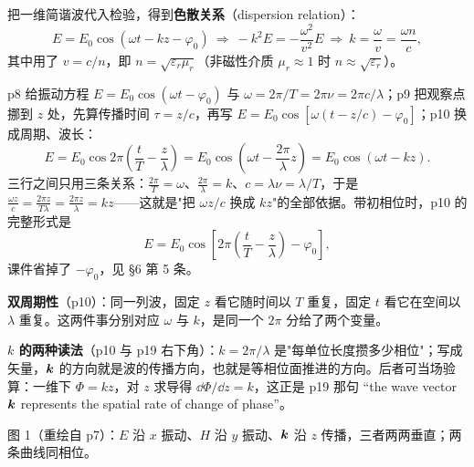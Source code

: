 \documentclass[10pt]{ctexart}
\begin{document}

把一维简谐波代入检验，得到\textbf{色散关系}（dispersion relation）：
\[
E=E_0\cos(\omega t-kz-\varphi_0)
\ \Longrightarrow\
-k^2E=-\frac{\omega^2}{v^2}E
\ \Longrightarrow\
k=\frac{\omega}{v}=\frac{\omega n}{c},
\]
其中用了 $v=c/n$，即 $n=\sqrt{\varepsilon_r\mu_r}$（非磁性介质 $\mu_r\approx1$ 时 $n\approx\sqrt{\varepsilon_r}$）。

\subhdr{1.3 简谐波：四种写法其实是一个}

p8 给振动方程 $E=E_0\cos(\omega t-\varphi_0)$ 与 $\omega=2\pi/T=2\pi\nu=2\pi c/\lambda$；p9 把观察点挪到 $z$ 处，先算传播时间 $\tau=z/c$，再写 $E=E_0\cos[\omega(t-z/c)-\varphi_0]$；p10 换成周期、波长：
\[
E=E_0\cos 2\pi\!\left(\frac{t}{T}-\frac{z}{\lambda}\right)
=E_0\cos\!\left(\omega t-\frac{2\pi}{\lambda}z\right)
=E_0\cos(\omega t-kz).
\]
三行之间只用三条关系：$\frac{2\pi}{T}=\omega$、$\frac{2\pi}{\lambda}=k$、$c=\lambda\nu=\lambda/T$，于是 $\frac{\omega z}{c}=\frac{2\pi z}{T\lambda}=\frac{2\pi z}{\lambda}=kz$——这就是"把 $\omega z/c$ 换成 $kz$"的全部依据。带初相位时，p10 的完整形式是
\[
E=E_0\cos\!\left[2\pi\!\left(\frac{t}{T}-\frac{z}{\lambda}\right)-\varphi_0\right],
\]
课件省掉了 $-\varphi_0$，见 §6 第 5 条。


\textbf{双周期性}（p10）：同一列波，固定 $z$ 看它随时间以 $T$ 重复，固定 $t$ 看它在空间以 $\lambda$ 重复。这两件事分别对应 $\omega$ 与 $k$，是同一个 $2\pi$ 分给了两个变量。

\textbf{$k$ 的两种读法}（p10 与 p19 右下角）：$k=2\pi/\lambda$ 是"每单位长度攒多少相位"；写成矢量，$\boldsymbol{k}$ 的方向就是波的传播方向，也就是等相位面推进的方向。后者可当场验算：一维下 $\Phi=kz$，对 $z$ 求导得 $\dd\Phi/\dd z=k$，这正是 p19 那句 “the wave vector $\boldsymbol{k}$ represents the spatial rate of change of phase”。

\begin{center}

{\footnotesize\color{inkgray}图 1（重绘自 p7）：$E$ 沿 $x$ 振动、$H$ 沿 $y$ 振动、$\boldsymbol{k}$ 沿 $z$ 传播，三者两两垂直；两条曲线同相位。}
\end{center}
\end{document}
